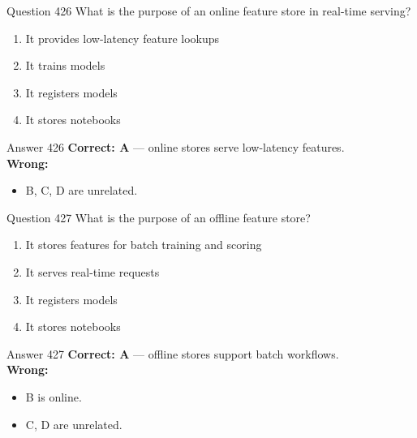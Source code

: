 \documentclass[aspectratio=169,11pt]{beamer}
\begin{document}
	\begin{frame}{Question 426}
		What is the purpose of an online feature store in real-time serving?
		\begin{enumerate}[label=\Alph*.]
			\item It provides low-latency feature lookups
			\item It trains models
			\item It registers models
			\item It stores notebooks
		\end{enumerate}
	\end{frame}
	\begin{frame}{Answer 426}
		\textbf{Correct: A} --- online stores serve low-latency features.\\
		\vspace{0.5em}
		\textbf{Wrong:}
		\begin{itemize}
			\item B, C, D are unrelated.
		\end{itemize}
	\end{frame}
	
	\begin{frame}{Question 427}
		What is the purpose of an offline feature store?
		\begin{enumerate}[label=\Alph*.]
			\item It stores features for batch training and scoring
			\item It serves real-time requests
			\item It registers models
			\item It stores notebooks
		\end{enumerate}
	\end{frame}
	\begin{frame}{Answer 427}
		\textbf{Correct: A} --- offline stores support batch workflows.\\
		\vspace{0.5em}
		\textbf{Wrong:}
		\begin{itemize}
			\item B is online.
			\item C, D are unrelated.
		\end{itemize}
	\end{frame}
	
\end{document}
